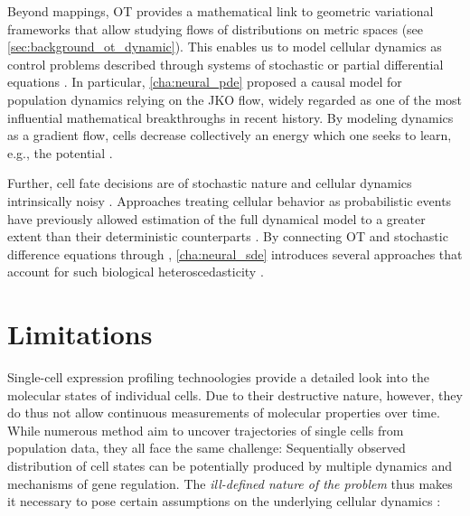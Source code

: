 Beyond mappings, OT provides a mathematical link to geometric variational frameworks that allow studying flows of distributions on metric spaces (see \cref{sec:background_ot_dynamic}).
This enables us to model cellular dynamics as control problems described through systems of stochastic \citep[\cref{cha:neural_sde}]{bunne2022recovering, somnath2023aligned} or partial differential equations \citep[\cref{cha:neural_pde}]{bunne2022proximal}.
In particular, \cref{cha:neural_pde} proposed a causal model for population dynamics relying on the \acrfull{JKO} flow, widely regarded as one of the most influential mathematical breakthroughs in recent history. By modeling dynamics as a gradient flow, cells decrease collectively an energy which one seeks to learn, e.g., the \citeauthor{waddington1957strategy} potential \citep{bunne2022proximal}. 

Further, cell fate decisions are of stochastic nature and cellular dynamics intrinsically noisy \citep{wilkinson2009stochastic}.
Approaches treating cellular behavior as probabilistic events have previously allowed estimation of the full dynamical model to a greater extent than their deterministic counterparts \citep{bergen2020generalizing}.
By connecting OT and stochastic difference equations through , \cref{cha:neural_sde} introduces several approaches that account for such biological heteroscedasticity \citep{bunne2022recovering, somnath2023aligned}.

\section*{Limitations}

Single-cell expression profiling technoologies provide a detailed look into the molecular states of individual cells. Due to their destructive nature, however, they do thus not allow continuous measurements of molecular properties over time. While numerous method aim to uncover trajectories of single cells from population data, they all face the same challenge: Sequentially observed distribution of cell states can be potentially produced by multiple dynamics and mechanisms of gene regulation. The \emph{ill-defined nature of the problem} thus makes it necessary to pose certain assumptions on the underlying cellular dynamics \citep{weinreb2018fundamental}:

